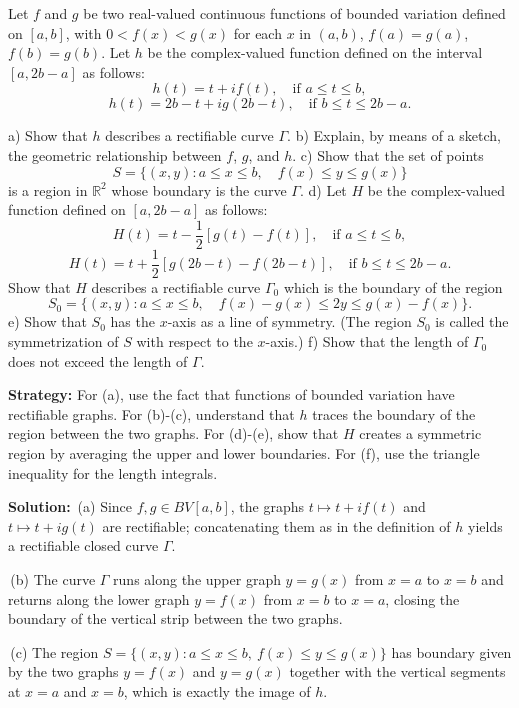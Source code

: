 \begin{problembox}
Let $f$ and $g$ be two real-valued continuous functions of bounded variation defined on $[a, b]$, with $0 < f(x) < g(x)$ for each $x$ in $(a, b)$, $f(a) = g(a)$, $f(b) = g(b)$. Let $h$ be the complex-valued function defined on the interval $[a, 2b - a]$ as follows:
\[h(t) = t + i f(t), \quad \text{if } a \leq t \leq b,\]
\[h(t) = 2b - t + ig(2b - t), \quad \text{if } b \leq t \leq 2b - a.\]

a) Show that $h$ describes a rectifiable curve $\Gamma$.
b) Explain, by means of a sketch, the geometric relationship between $f$, $g$, and $h$.
c) Show that the set of points
\[S = \{ (x, y) : a \leq x \leq b, \quad f(x) \leq y \leq g(x) \}\]
is a region in $\mathbb{R}^2$ whose boundary is the curve $\Gamma$.
d) Let $H$ be the complex-valued function defined on $[a, 2b - a]$ as follows:
\[H(t) = t - \frac{1}{2} [g(t) - f(t)], \quad \text{if } a \leq t \leq b,\]
\[H(t) = t + \frac{1}{2} [g(2b - t) - f(2b - t)], \quad \text{if } b \leq t \leq 2b - a.\]
Show that $H$ describes a rectifiable curve $\Gamma_0$ which is the boundary of the region
\[S_0 = \{ (x, y) : a \leq x \leq b, \quad f(x) - g(x) \leq 2y \leq g(x) - f(x) \}.\]
e) Show that $S_0$ has the $x$-axis as a line of symmetry. (The region $S_0$ is called the symmetrization of $S$ with respect to the $x$-axis.)
f) Show that the length of $\Gamma_0$ does not exceed the length of $\Gamma$.
\end{problembox}

\noindent\textbf{Strategy:} For (a), use the fact that functions of bounded variation have rectifiable graphs. For (b)-(c), understand that $h$ traces the boundary of the region between the two graphs. For (d)-(e), show that $H$ creates a symmetric region by averaging the upper and lower boundaries. For (f), use the triangle inequality for the length integrals.

\bigskip\noindent\textbf{Solution:}
\,(a) Since $f,g\in BV[a,b]$, the graphs $t\mapsto t+if(t)$ and $t\mapsto t+ig(t)$ are rectifiable; concatenating them as in the definition of $h$ yields a rectifiable closed curve $\Gamma$.

\,(b) The curve $\Gamma$ runs along the upper graph $y=g(x)$ from $x=a$ to $x=b$ and returns along the lower graph $y=f(x)$ from $x=b$ to $x=a$, closing the boundary of the vertical strip between the two graphs.

\,(c) The region $S=\{(x,y): a\le x\le b,\ f(x)\le y\le g(x)\}$ has boundary given by the two graphs $y=f(x)$ and $y=g(x)$ together with the vertical segments at $x=a$ and $x=b$, which is exactly the image of $h$.

